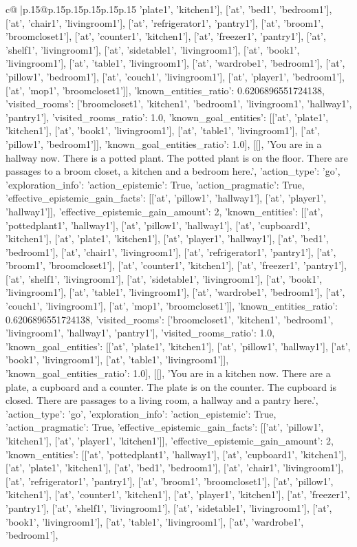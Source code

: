\documentclass{article}
\begin{document}
{\begin{supertabular}{c@{$\;$}|p{.15\linewidth}@{}p{.15\linewidth}p{.15\linewidth}p{.15\linewidth}p{.15\linewidth}p{.15\linewidth}}
{{{'plate1', 'kitchen1'], ['at', 'bed1', 'bedroom1'], ['at', 'chair1', 'livingroom1'], ['at', 'refrigerator1', 'pantry1'], ['at', 'broom1', 'broomcloset1'], ['at', 'counter1', 'kitchen1'], ['at', 'freezer1', 'pantry1'], ['at', 'shelf1', 'livingroom1'], ['at', 'sidetable1', 'livingroom1'], ['at', 'book1', 'livingroom1'], ['at', 'table1', 'livingroom1'], ['at', 'wardrobe1', 'bedroom1'], ['at', 'pillow1', 'bedroom1'], ['at', 'couch1', 'livingroom1'], ['at', 'player1', 'bedroom1'], ['at', 'mop1', 'broomcloset1']], 'known_entities_ratio': 0.6206896551724138, 'visited_rooms': ['broomcloset1', 'kitchen1', 'bedroom1', 'livingroom1', 'hallway1', 'pantry1'], 'visited_rooms_ratio': 1.0, 'known_goal_entities': [['at', 'plate1', 'kitchen1'], ['at', 'book1', 'livingroom1'], ['at', 'table1', 'livingroom1'], ['at', 'pillow1', 'bedroom1']], 'known_goal_entities_ratio': 1.0}}], [[], 'You are in a hallway now. There is a potted plant. The potted plant is on the floor. There are passages to a broom closet, a kitchen and a bedroom here.', {'action_type': 'go', 'exploration_info': {'action_epistemic': True, 'action_pragmatic': True, 'effective_epistemic_gain_facts': [['at', 'pillow1', 'hallway1'], ['at', 'player1', 'hallway1']], 'effective_epistemic_gain_amount': 2, 'known_entities': [['at', 'pottedplant1', 'hallway1'], ['at', 'pillow1', 'hallway1'], ['at', 'cupboard1', 'kitchen1'], ['at', 'plate1', 'kitchen1'], ['at', 'player1', 'hallway1'], ['at', 'bed1', 'bedroom1'], ['at', 'chair1', 'livingroom1'], ['at', 'refrigerator1', 'pantry1'], ['at', 'broom1', 'broomcloset1'], ['at', 'counter1', 'kitchen1'], ['at', 'freezer1', 'pantry1'], ['at', 'shelf1', 'livingroom1'], ['at', 'sidetable1', 'livingroom1'], ['at', 'book1', 'livingroom1'], ['at', 'table1', 'livingroom1'], ['at', 'wardrobe1', 'bedroom1'], ['at', 'couch1', 'livingroom1'], ['at', 'mop1', 'broomcloset1']], 'known_entities_ratio': 0.6206896551724138, 'visited_rooms': ['broomcloset1', 'kitchen1', 'bedroom1', 'livingroom1', 'hallway1', 'pantry1'], 'visited_rooms_ratio': 1.0, 'known_goal_entities': [['at', 'plate1', 'kitchen1'], ['at', 'pillow1', 'hallway1'], ['at', 'book1', 'livingroom1'], ['at', 'table1', 'livingroom1']], 'known_goal_entities_ratio': 1.0}}], [[], 'You are in a kitchen now. There are a plate, a cupboard and a counter. The plate is on the counter. The cupboard is closed. There are passages to a living room, a hallway and a pantry here.', {'action_type': 'go', 'exploration_info': {'action_epistemic': True, 'action_pragmatic': True, 'effective_epistemic_gain_facts': [['at', 'pillow1', 'kitchen1'], ['at', 'player1', 'kitchen1']], 'effective_epistemic_gain_amount': 2, 'known_entities': [['at', 'pottedplant1', 'hallway1'], ['at', 'cupboard1', 'kitchen1'], ['at', 'plate1', 'kitchen1'], ['at', 'bed1', 'bedroom1'], ['at', 'chair1', 'livingroom1'], ['at', 'refrigerator1', 'pantry1'], ['at', 'broom1', 'broomcloset1'], ['at', 'pillow1', 'kitchen1'], ['at', 'counter1', 'kitchen1'], ['at', 'player1', 'kitchen1'], ['at', 'freezer1', 'pantry1'], ['at', 'shelf1', 'livingroom1'], ['at', 'sidetable1', 'livingroom1'], ['at', 'book1', 'livingroom1'], ['at', 'table1', 'livingroom1'], ['at', 'wardrobe1', 'bedroom1'], }}}
\end{supertabular}}
\end{document}
